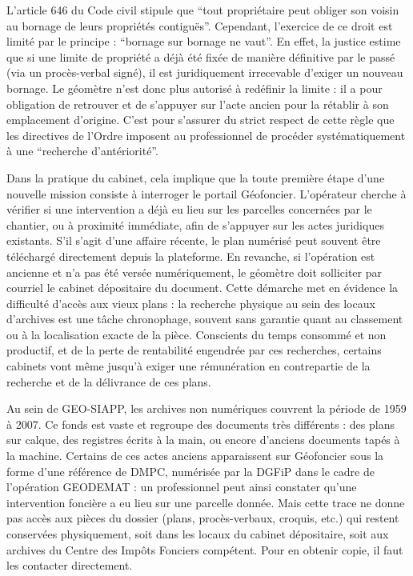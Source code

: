 L'article 646 du Code civil stipule que \enquote{tout propriétaire peut obliger son voisin au bornage de leurs propriétés contiguës}. Cependant, l'exercice de ce droit est limité par le principe : \enquote{bornage sur bornage ne vaut}. En effet, la justice estime que si une limite de propriété a déjà été fixée de manière définitive par le passé (via un procès-verbal signé), il est juridiquement irrecevable d'exiger un nouveau bornage. Le géomètre n'est donc plus autorisé à redéfinir la limite : il a pour obligation de retrouver et de s'appuyer sur l'acte ancien pour la rétablir à son emplacement d'origine. C'est pour s'assurer du strict respect de cette règle que les directives de l'Ordre imposent au professionnel de procéder systématiquement à une \enquote{recherche d'antériorité}. 

Dans la pratique du cabinet, cela implique que la toute première étape d'une nouvelle mission consiste à interroger le portail Géofoncier. L'opérateur cherche à vérifier si une intervention a déjà eu lieu sur les parcelles concernées par le chantier, ou à proximité immédiate, afin de s'appuyer sur les actes juridiques existants. S'il s'agit d'une affaire récente, le plan numérisé peut souvent être téléchargé directement depuis la plateforme. En revanche, si l'opération est ancienne et n'a pas été versée numériquement, le géomètre doit solliciter par courriel le cabinet dépositaire du document. Cette démarche met en évidence la difficulté d'accès aux vieux plans : la recherche physique au sein des locaux d'archives est une tâche chronophage, souvent sans garantie quant au classement ou à la localisation exacte de la pièce. Conscients du temps consommé et non productif, et de la perte de rentabilité engendrée par ces recherches, certains cabinets vont même jusqu'à exiger une rémunération en contrepartie de la recherche et de la délivrance de ces plans.

Au sein de GEO-SIAPP, les archives non numériques couvrent la période de 1959 à 2007. Ce fonds est vaste et regroupe des documents très différents : des plans sur calque, des registres écrits à la main, ou encore d'anciens documents tapés à la machine. Certains de ces actes anciens apparaissent sur Géofoncier sous la forme d'une référence de DMPC, numérisée par la DGFiP dans le cadre de l'opération GEODEMAT : un professionnel peut ainsi constater qu'une intervention foncière a eu lieu sur une parcelle donnée. Mais cette trace ne donne pas accès aux pièces du dossier (plans, procès-verbaux, croquis, etc.) qui restent conservées physiquement, soit dans les locaux du cabinet dépositaire, soit aux archives du Centre des Impôts Fonciers compétent. Pour en obtenir copie, il faut les contacter directement.

